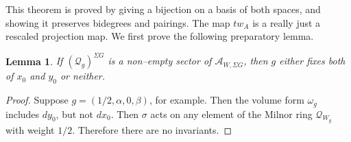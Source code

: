 \documentclass[10pt, letterpaper]{amsart}
\newtheorem{lem}[thm]{Lemma}
\theoremstyle{remark}
\newcommand{\sA}{\mathscr{A}}
\newcommand{\sQ}{\mathscr{Q}}
\newcommand{\s}[1]{\Sigma #1}
\begin{document}
This theorem is proved by giving a bijection on a basis of both spaces, and showing it preserves bidegrees and pairings. The map $tw_A$ is a really just a rescaled projection map. We first prove the following preparatory lemma. 

\begin{lem}\label{l:allornothing}
If $(\sQ_{g})^{\s{G}}$ is a non--empty sector of $\sA_{W,\s{G}}$, then $g$ either fixes both of $x_0$ and $y_0$ or neither. 
\end{lem}
\begin{proof}
Suppose $g=(1/2,\alpha, 0,\beta)$, for example. Then the volume form $\omega_g$ includes $dy_0$, but not $dx_0$. Then $\sigma$ acts on any element of the Milnor ring $\sQ_{W_g}$ with weight $1/2$. Therefore there are no invariants. 
\end{proof}
\end{document}
